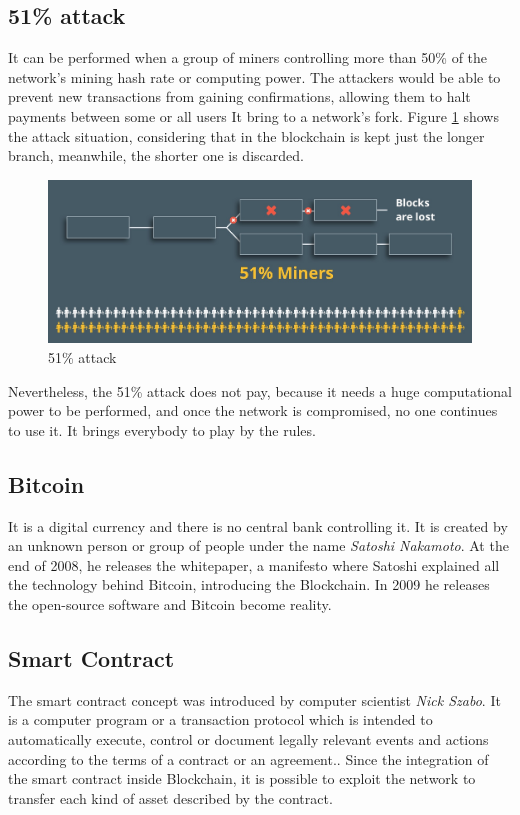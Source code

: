 \subsection{51\% attack}
It can be performed when a group of miners controlling more than 50\% of the network's mining hash rate or computing power.
The attackers would be able to prevent new transactions from gaining confirmations, allowing them to halt payments between 
some or all users
It bring to a network's fork. Figure \ref{fig:attack} shows the attack situation, considering that in the blockchain is 
kept just the longer branch, meanwhile, the shorter one is discarded.\cite{attack}
 
\begin{figure}[h!]
    \centering
    \includegraphics[totalheight=5cm]{img/51attack.jpg}
    \caption{51\% attack}
    \label{fig:attack}
\end{figure}

Nevertheless, the 51\% attack does not pay, because it needs a huge computational power to be performed, and once the 
network is compromised, no one continues to use it. It brings everybody to play by the rules. 

\subsection{Bitcoin}
It is a digital currency and there is no central bank controlling it. It is created by an unknown person or group of 
people under the name \textit{Satoshi Nakamoto}. At the end of 2008, he releases the whitepaper, a manifesto where 
Satoshi explained all the technology behind Bitcoin, introducing the Blockchain. In 2009 he releases the open-source 
software and Bitcoin become reality. 

\subsection{Smart Contract}

The smart contract concept was introduced by computer scientist \textit{Nick Szabo}. It is a computer program or a 
transaction protocol which is intended to automatically execute, control or document legally relevant events and 
actions according to the terms of a contract or an agreement.\cite{sc-def}. Since the integration of the smart
contract inside Blockchain, it is possible to exploit the network to transfer each kind of asset described by the 
contract. 


